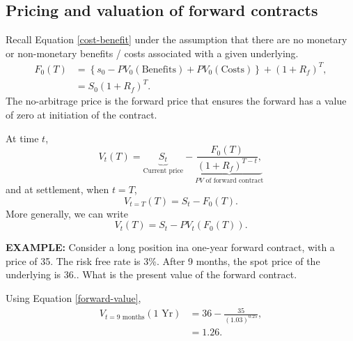 \documentclass[../notes_compiled.tex]{subfiles}
\begin{document}
\subsection{Pricing and valuation of forward contracts}
\begin{itemize}
\item Recall Equation \ref{cost-benefit} under the assumption that there are no monetary or non-monetary benefits / costs associated with a given underlying.
\begin{align}
F_{0}(T) &= \left\{ s_{0} - PV_{0}(\text{Benefits}) + PV_{0}(\text{Costs}) \right\} + (1+R_{f})^{T}, \nonumber \\
&= S_{0}(1+R_{f})^{T}.
\end{align}
The no-arbitrage price is the forward price that ensures the forward has a value of zero at initiation of the contract.
\item[] At time $t$, 
\begin{equation}
V_{t}(T) = \underbrace{S_{t}}_{\text{Current price}} - \underbrace{\frac{F_{0}(T)}{(1+R_{f})^{T-t}},}_{\text{$PV$ of forward contract}}
\end{equation}
and at settlement, when $t=T$,
\begin{equation}
V_{t=T}(T) = S_{t} - F_{0}(T).
\end{equation}
More generally, we can write
\begin{equation}
V_{t}(T) = S_{t} - PV_{t}(F_{0}(T)). \label{forward-value}
\end{equation}
{\color{RedViolet}
\item[] \textbf{EXAMPLE:} Consider a long position ina one-year forward contract, with a price of 35. The risk free rate is 3\%. After 9 months, the spot price of the underlying is 36.. What is the present value of the forward contract.
}
{\color{RoyalBlue}
\item[] Using Equation \ref{forward-value},
\begin{align}
V_{t = \text{9 months}}(\text{1 Yr}) &= 36 - \frac{35}{(1.03)^{0.25}}, \\
&=1.26.
\end{align}
}
\end{itemize}
\end{document}
